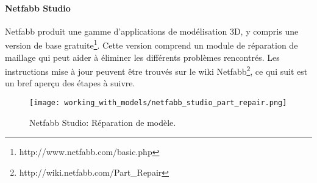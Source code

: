 
\paragraph{Netfabb Studio} %
\label{par:netfabb_studio}
Netfabb produit une gamme d'applications de mod\'elisation 3D, y compris une version de base gratuite\footnote{http://www.netfabb.com/basic.php}.  Cette version comprend un module de r\'eparation de maillage qui peut aider \`a \'eliminer les diff\'erents probl\`emes rencontr\'es. Les instructions mise \`a jour peuvent \^etre trouv\'es sur le wiki Netfabb\footnote{http://wiki.netfabb.com/Part\_Repair}, ce qui suit est un bref aperçu des \'etapes \`a suivre.

\begin{figure}[H]
\centering
\texttt{[image: working\_with\_models/netfabb\_studio\_part\_repair.png]}
\caption{Netfabb Studio: R\'eparation de mod\`ele.}
\label{fig:netfabb_studio_part_repair}
\end{figure}


